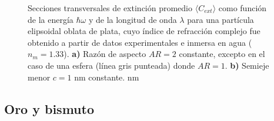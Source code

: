 \begin{figure}[h!]
	\quad%
	\caption{Secciones transversales de extinción promedio $\langle C_{ext}\rangle$ como función de la energía $\hbar\omega$ y de la longitud de onda $\lambda$ para una partícula elipsoidal oblata de plata, cuyo índice de refracción complejo fue obtenido a partir de datos experimentales  e inmersa en agua ($n_m=1.33$). \textbf{a)} Razón de aspecto $AR=2$ constante, excepto en el caso de una esfera (línea gris punteada) donde $AR=1$. \textbf{b)} Semieje menor $c=1$ nm constante. nm}\label{fig:test}
\end{figure}

\subsection*{Oro y bismuto}

